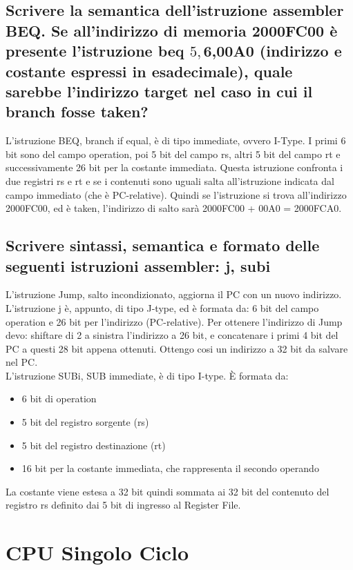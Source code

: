 \documentclass[italian]{article}
\begin{document}
	\subsection{Scrivere la semantica dell’istruzione assembler BEQ. Se all’indirizzo di memoria 2000FC00 è presente l’istruzione beq $5,$6,00A0 (indirizzo e costante espressi in esadecimale), quale sarebbe l’indirizzo target nel caso in cui il branch fosse taken?}
	
	L’istruzione BEQ, branch if equal, è di tipo immediate, ovvero I-Type. I primi 6 bit sono del campo operation, poi 5 bit del campo rs, altri 5 bit del campo rt e successivamente 26 bit per la costante immediata. Questa istruzione confronta i due registri rs e rt e se i contenuti sono uguali salta all’istruzione indicata dal campo immediato (che è PC-relative). Quindi se l’istruzione si trova all’indirizzo 2000FC00, ed è taken, l’indirizzo di salto sarà 2000FC00 + 00A0 = 2000FCA0.
	
	\subsection{Scrivere sintassi, semantica e formato delle seguenti istruzioni assembler: j, subi}
	L’istruzione Jump, salto incondizionato, aggiorna il PC con un nuovo indirizzo. L’istruzione j è, appunto, di tipo J-type, ed è formata da: 6 bit del campo operation e 26 bit per l’indirizzo (PC-relative). Per ottenere l’indirizzo di Jump devo: shiftare di 2 a sinistra l’indirizzo a 26 bit, e concatenare i primi 4 bit del PC a questi 28 bit appena ottenuti. Ottengo cosi un indirizzo a 32 bit da salvare nel PC. \\[2mm]
	L’istruzione SUBi, SUB immediate, è di tipo I-type. È formata da:
	\begin{itemize}[noitemsep]
		\item 6 bit di operation
		\item 5 bit del registro sorgente (rs)
		\item 5 bit del registro destinazione (rt)
		\item 16 bit per la costante immediata, che rappresenta il secondo operando
	\end{itemize}	
	La costante viene estesa a 32 bit quindi sommata ai 32 bit del contenuto del registro rs definito dai 5 bit di ingresso al Register File.
	
	\newpage
	
	\section{CPU Singolo Ciclo}
\end{document}
